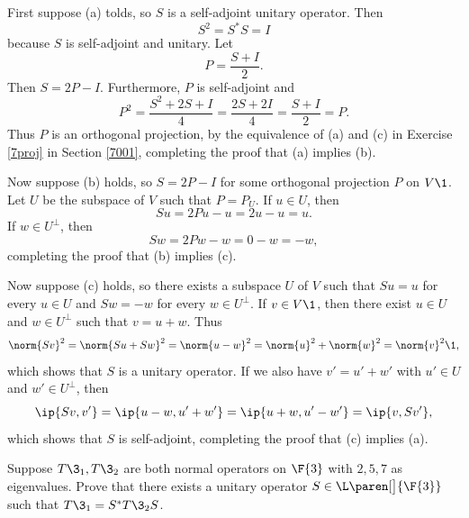 \begin{Solution}
First suppose (a) tolds, so $S$ is a self-adjoint unitary operator. Then
\[
S^2 = S^* S = I
\]
because $S$ is self-adjoint and unitary.
Let
\[
P = \frac{S + I}{2}.
\]
Then $S = 2P - I$. Furthermore, $P$ is self-adjoint and
\[
P^2 = \frac{S^2 + 2S + I}{4} = \frac{2S + 2I}{4} = \frac{S + I}{2} = P.
\]
Thus $P$ is an orthogonal projection, by the equivalence of (a) and (c) in Exercise \ref{7proj} in Section \ref{7001}, completing the proof that (a) implies (b).

Now suppose (b) holds, so $S = 2P - I$ for some orthogonal projection $P$ on $V\1$. Let $U$ be the subspace of $V$ such that
$P = P_{\!U}$. If $u \in U$, then
\[
Su = 2Pu - u = 2u - u = u.
\]
If $w \in U^\perp\!$, then
\[
Sw = 2Pw - w = 0 - w = -w,
\]
completing the proof that (b) implies (c).

Now suppose (c) holds, so there exists a subspace $U$ of $V$ such that $Su = u$ for every $u \in U$ and $Sw = -w$ for every $w \in U^\perp\!$. If $v \in V\1$, then there exist $u \in U$ and $w \in U^\perp$ such that $v = u+ w$. Thus
\[
\norm{Sv}^2 = \norm{Su + Sw}^2 = \norm{u - w}^2 = \norm{u}^2 + \norm{w}^2 = \norm{v}^2\1,
\]
which shows that $S$ is a unitary operator. If we also have $v' = u' + w'$ with $u' \in U$ and $w' \in U^\perp\!$, then
\[
\ip{Sv, v'} = \ip{u - w, u' + w'} = \ip{u + w, u' - w'} = \ip{v, Sv'},
\]
which shows that $S$ is self-adjoint, completing the proof that (c) implies (a).
\end{Solution}

\exercise
Suppose $T\3_1, T\3_2$ are both normal operators on $\F{3}$ with $2, 5, 7$ as eigenvalues. Prove that there exists a unitary operator $S\in \L\paren[\big]{\F{3}}$ such that
$
T\3_1 = S^* T\3_2 S$.

